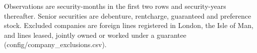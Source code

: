 Observations are security-months in the first two rows and security-years thereafter. Senior securities are debenture, rentcharge, guaranteed and preference stock. Excluded companies are foreign lines registered in London, the Isle of Man, and lines leased, jointly owned or worked under a guarantee (config/company\_exclusions.csv).
